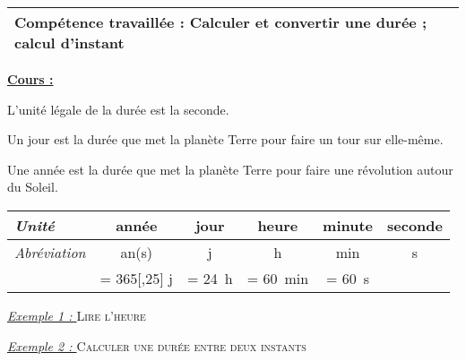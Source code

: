 \documentclass[12pt]{memoir}
\begin{document}
\linespread{1.5}

\begin{tabular}{*{1}{|p{18cm}}|}\hline
    \normalsize Compétence travaillée : Calculer et convertir une durée ; calcul d'instant\\\hline
\end{tabular}

\vspace{2cm}

\textbf{\underline{Cours :}}
\par L'unité légale de la durée est la seconde.
\par Un jour est la durée que met la planète Terre pour faire un tour sur elle-même.
\par Une année est la durée que met la planète Terre pour faire une révolution autour du Soleil.

\begin{center}
\begin{tabular}{|p{2.5cm}*{5}{|c}|}\hline
    \textit{Unité} & année & jour & heure & minute & seconde \\\hline
    \textit{Abréviation} & an(s) & j & h & min & s \\\hline
    & = 365[,25] j & = \qty{24}{h} & = \qty{60}{min} & = \qty{60}{s} & \\\hline
\end{tabular}
\end{center}

\textit{\underline{Exemple 1 : }} \textsc{Lire l'heure}\\[-0.2cm]

\newcommand{\horloge}
{
    \begin{tikzpicture}
        \draw (0,0) circle (2);
        \draw[fill=black] (0,0) circle (0.05);
    \end{tikzpicture}
}

\textit{\underline{Exemple 2 : }} \textsc{Calculer une durée entre deux instants}\\[-0.2cm]

\clearpage

\newcommand{\dotss}{..................}
\newcommand{\dotsss}{............................................}
\end{document}
